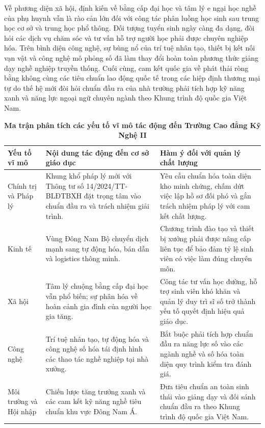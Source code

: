 Về phương diện xã hội, định kiến về bằng cấp đại học và tâm lý e ngại học nghề của phụ huynh vẫn là rào cản lớn đối với công tác phân luồng học sinh sau trung học cơ sở và trung học phổ thông. Đối tượng tuyển sinh ngày càng đa dạng, đòi hỏi các dịch vụ chăm sóc và tư vấn hỗ trợ người học phải được chuyên nghiệp hóa. Trên bình diện công nghệ, sự bùng nổ của trí tuệ nhân tạo, thiết bị kết nối vạn vật và công nghệ mô phỏng số đã làm thay đổi hoàn toàn phương thức giảng dạy nghề nghiệp truyền thống. Cuối cùng, cam kết quốc gia về phát thải ròng bằng không cùng các tiêu chuẩn lao động quốc tế trong các hiệp định thương mại tự do thế hệ mới đòi hỏi chuẩn đầu ra của nhà trường phải tích hợp kỹ năng xanh và năng lực ngoại ngữ chuyên ngành theo Khung trình độ quốc gia Việt Nam.

\begin{table}[htbp]
\centering
\small
{}
\caption{\textbf{Ma trận phân tích các yếu tố vĩ mô tác động đến Trường Cao đẳng Kỹ Nghệ II}}
\vspace{0.2cm}
\begin{tabularx}{\textwidth}{L{2.8cm} X X}
\toprule
\textbf{Yếu tố vĩ mô} & \textbf{Nội dung tác động đến cơ sở giáo dục} & \textbf{Hàm ý đối với quản lý chất lượng} \\
\midrule
Chính trị và Pháp lý & Khung khổ pháp lý mới với Thông tư số 14/2024/TT-BLĐTBXH đặt trọng tâm vào chuẩn đầu ra và trách nhiệm giải trình. & Yêu cầu chuẩn hóa toàn diện kho minh chứng, chấm dứt việc lập hồ sơ đối phó và gắn trách nhiệm pháp lý với cam kết chất lượng. \\
\addlinespace
Kinh tế & Vùng Đông Nam Bộ chuyển dịch mạnh sang tự động hóa, bán dẫn và logistics thông minh. & Chương trình đào tạo và thiết bị xưởng phải được nâng cấp liên tục để bảo đảm tỷ lệ sinh viên có việc làm đúng chuyên môn. \\
\addlinespace
Xã hội & Tâm lý chuộng bằng cấp đại học vẫn phổ biến; sự phân hóa về hoàn cảnh gia đình của người học gia tăng. & Công tác tư vấn học đường, hỗ trợ sinh viên khó khăn và quản lý duy trì sĩ số trở thành yếu tố quyết định hiệu quả giáo dục. \\
\addlinespace
Công nghệ & Trí tuệ nhân tạo, tự động hóa và công nghệ số hóa tái định hình các thao tác nghề nghiệp tại nhà xưởng. & Bắt buộc phải tích hợp chuẩn đầu ra năng lực số vào các ngành nghề và số hóa toàn diện quy trình kiểm tra đánh giá. \\
\addlinespace
Môi trường và Hội nhập & Chiến lược tăng trưởng xanh và các cam kết kỹ năng nghề tiêu chuẩn khu vực Đông Nam Á. & Đưa tiêu chuẩn an toàn sinh thái vào giảng dạy và đối sánh chuẩn đầu ra theo Khung trình độ quốc gia Việt Nam. \\
\bottomrule
\end{tabularx}
\end{table}

